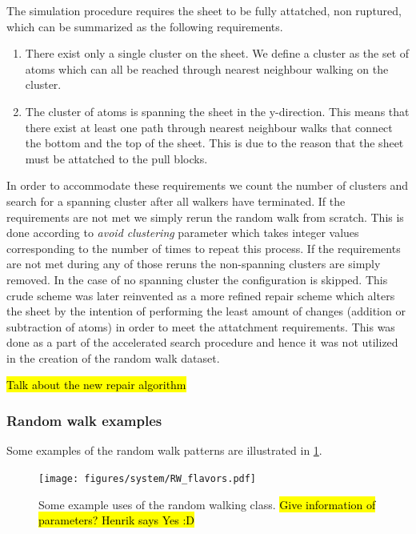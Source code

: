 The simulation procedure requires the sheet to be fully attatched, non ruptured, which can be summarized as the following requirements. 
\begin{enumerate}
  \item There exist only a single cluster on the sheet. We define a cluster as the set of atoms which can all be reached through nearest neighbour walking on the cluster.
  \item The cluster of atoms is spanning the sheet in the y-direction. This means that there exist at least one path through nearest neighbour walks that connect the bottom and the top of the sheet. This is due to the reason that the sheet must be attatched to the pull blocks.
\end{enumerate}
In order to accommodate these requirements we count the number of clusters and search for a spanning cluster after all walkers have terminated. If the requirements are not met we simply rerun the random walk from scratch. This is done according to \textit{avoid clustering} parameter which takes integer values corresponding to the number of times to repeat this process. If the requirements are not met during any of those reruns the non-spanning clusters are simply removed. In the case of no spanning cluster the configuration is skipped. This crude scheme was later reinvented as a more refined repair scheme which alters the sheet by the intention of performing the least amount of changes (addition or subtraction of atoms) in order to meet the attatchment requirements. This was done as a part of the accelerated search procedure and hence it was not utilized in the creation of the random walk dataset. 

\hl{Talk about the new repair algorithm}
\subsubsection{Random walk examples}

Some examples of the random walk patterns are illustrated in \cref{fig:RW_flavors}.

\begin{figure}[h]
  \centering
  \texttt{[image: figures/system/RW\_flavors.pdf]}
  \caption{Some example uses of the random walking class. \hl{Give information of parameters? Henrik says Yes :D}}
  \label{fig:RW_flavors}
\end{figure}

%
%
%
%


